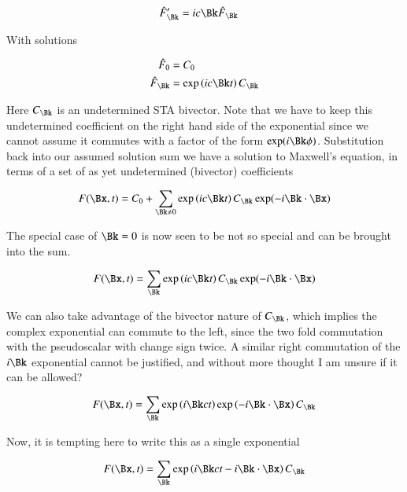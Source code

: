 \documentclass{article}
\begin{document}
\begin{align*}
\hat{F}_{\Bk}' &= i c \Bk \hat{F}_{\Bk}
\end{align*}

With solutions

\begin{align*}
\hat{F}_{0} &= C_{0} \\
\hat{F}_{\Bk} &= \exp\left(i c \Bk t \right) C_{\Bk} \\
\end{align*}

Here $C_{\Bk}$ is an undetermined STA bivector.  Note that we have to keep this undetermined coefficient on the right hand side of the exponential since we cannot assume it commutes with a factor of the form $\exp(i\Bk\phi)$.  Substitution back into our assumed solution sum we have a solution to Maxwell's equation, in terms of a set of as yet undetermined (bivector) coefficients

\begin{align*}
F(\Bx,t) = C_0 + \sum_{\Bk \ne 0} \exp\left(i c \Bk t \right) C_{\Bk} \exp(-i \Bk \cdot \Bx )
\end{align*}

The special case of $\Bk = 0$ is now seen to be not so special and can be brought into the sum.  

\begin{align*}
F(\Bx,t) = \sum_{\Bk} \exp\left(i c \Bk t \right) C_{\Bk} \exp(-i \Bk \cdot \Bx )
\end{align*}

We can also 
take advantage of the bivector nature of $C_{\Bk}$, which implies the complex exponential can commute to the left, since the two fold commutation with the pseudoscalar with change sign twice.  A similar right commutation of the $i\Bk$ exponential cannot be justified, and without more thought I am unsure if it can be allowed?

\begin{align}\label{eqn:undetermined}
F(\Bx,t) = \sum_{\Bk} 
\exp\left(i \Bk c t \right) 
\exp\left(-i \Bk \cdot \Bx \right) 
C_{\Bk} 
\end{align}

Now, it is tempting here to write this as a single exponential

\begin{align*}
F(\Bx,t) 
&= \sum_{\Bk} \exp\left(i \Bk c t - i\Bk \cdot \Bx \right) C_{\Bk} \\
\end{align*}
\end{document}
